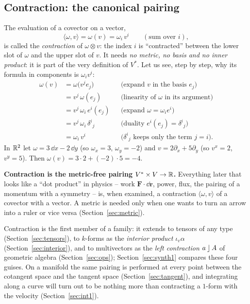 \subsection{Contraction: the canonical pairing}\label{sec:contraction}

The evaluation of a covector on a vector,
\begin{equation}\label{eq:pairing}
\langle\omega,v\rangle=\omega(v)=\omega_i\,v^i\qquad(\text{sum over }i),
\end{equation}
is called the \emph{contraction} of $\omega\otimes v$: the index $i$ is ``contracted'' between the lower slot of $\omega$ and the
upper slot of $v$. It needs \emph{no metric, no basis and no inner product}: it is part of the very definition of $V^*$.
Let us see, step by step, why its formula in components is $\omega_iv^i$:
\begin{align*}
\omega(v)&=\omega\bigl(v^je_j\bigr) &&\text{(expand $v$ in the basis $e_j$)}\\
&=v^j\,\omega(e_j) &&\text{(linearity of $\omega$ in its argument)}\\
&=v^j\,\omega_i\,e^i(e_j) &&\text{(expand $\omega=\omega_ie^i$)}\\
&=v^j\,\omega_i\,\delta^i{}_j &&\text{(duality $e^i(e_j)=\delta^i{}_j$)}\\
&=\omega_i\,v^i &&\text{($\delta^i{}_j$ keeps only the term $j=i$).}
\end{align*}
\numcheck In $\mathbb{R}^2$ let $\omega=3\,\dd x-2\,\dd y$ (so $\omega_x=3$, $\omega_y=-2$) and $v=2\partial_x+5\partial_y$
(so $v^x=2$, $v^y=5$). Then $\omega(v)=3\cdot2+(-2)\cdot5=-4$.



\begin{keyidea}
\textbf{Contraction is the metric-free pairing $V^*\times V\to\mathbb{R}$.} Everything later that looks like a ``dot product'' in physics
-- work $\mathbf F\cdot\dd\mathbf r$, power, flux, the pairing of a momentum with a symmetry -- is, when examined, a contraction
$\langle\omega,v\rangle$ of a covector with a vector. A metric is needed only when one wants to turn an arrow into a ruler or
vice versa (Section~\ref{sec:metric}).
\end{keyidea}

Contraction is the first member of a family: it extends to tensors of any type (Section~\ref{sec:tensors}), to
$k$-forms as the \emph{interior product} $\iota_v\alpha$ (Section~\ref{sec:interior}), and to multivectors as the
\emph{left contraction} $a\mathbin{\rfloor} A$ of geometric algebra (Section~\ref{sec:ops}); Section~\ref{sec:synth1} compares these four
guises. On a manifold the same pairing is performed at every point between the cotangent space and the tangent space
(Section~\ref{sec:tangent}), and integrating along a curve will turn out to be nothing more than contracting a $1$-form with the
velocity (Section~\ref{sec:int1}).
